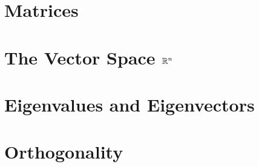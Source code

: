 \documentclass[11 pt]{book}
\begin{document}


\part{Matrices}




\part{The Vector Space $\mathbb{R}^n$}




\part{Eigenvalues and Eigenvectors}




\part{Orthogonality}

\end{document}
